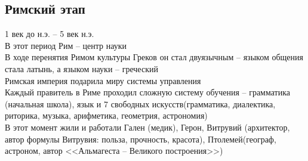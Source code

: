 \documentclass[12pt]{article}
\begin{document}
\subsection{Римский этап}
1 век до н.э. -- 5 век н.э.\\
В этот период Рим -- центр науки\\
В ходе перенятия Римом культуры Греков он стал двуязычным -- языком общения стала латынь, а языком науки -- греческий\\
Римская империя подарила миру системы управления\\
Каждый правитель в Риме проходил сложную систему обучения -- грамматика (начальная школа), язык и 7 свободных искусств(грамматика, диалектика, риторика, музыка, арифметика, геометрия, астрономия)\\
В этот момент жили и работали Гален (медик), Герон, Витрувий (архитектор, автор формулы Витрувия: польза, прочность, красота), Птолемей(географ, астроном, автор <<Альмагеста -- Великого построения>>)\\
\end{document}

